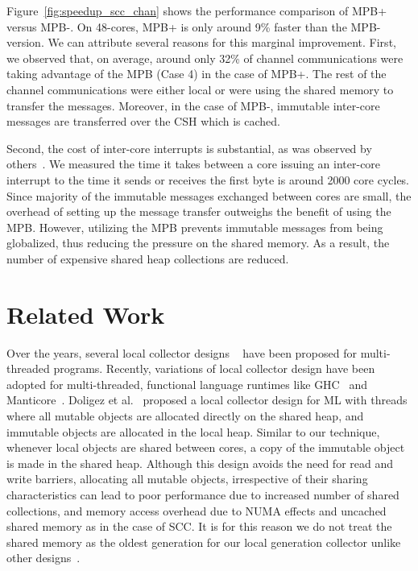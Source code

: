 Figure~\ref{fig:speedup_scc_chan} shows the performance comparison of MPB+
versus MPB-. On 48-cores, MPB+ is only around 9\% faster than the MPB- version.
We can attribute several reasons for this marginal improvement. First, we
observed that, on average, around only 32\% of channel communications were
taking advantage of the MPB (Case 4) in the case of MPB+. The rest of the
channel communications were either local or were using the shared memory to
transfer the messages. Moreover, in the case of MPB-, immutable inter-core
messages are transferred over the CSH which is cached.

Second, the cost of inter-core interrupts is substantial, as was observed by
others~\cite{Peter11,Darko11}. We measured the time it takes between a core
issuing an inter-core interrupt to the time it sends or receives the first byte
is around 2000 core cycles. Since majority of the immutable messages exchanged
between cores are small, the overhead of setting up the message transfer
outweighs the benefit of using the MPB. However, utilizing the MPB prevents
immutable messages from being globalized, thus reducing the pressure on the
shared memory. As a result, the number of expensive shared heap collections are
reduced.

\section{Related Work}

Over the years, several local collector designs ~\cite{Steele75, Doligez93,
Steensgaard00, Anderson10} have been proposed for multi-threaded programs.
Recently, variations of local collector design have been adopted for
multi-threaded, functional language runtimes like GHC~\cite{Marlow11} and
Manticore~\cite{Auhagen11}. Doligez et al.~\cite{Doligez93} proposed a local
collector design for ML with threads where all mutable objects are allocated
directly on the shared heap, and immutable objects are allocated in the local
heap. Similar to our technique, whenever local objects are shared between
cores, a copy of the immutable object is made in the shared heap. Although this
design avoids the need for read and write barriers, allocating all mutable
objects, irrespective of their sharing characteristics can lead to poor
performance due to increased number of shared collections, and memory access
overhead due to NUMA effects and uncached shared memory as in the case of SCC.
It is for this reason we do not treat the shared memory as the oldest
generation for our local generation collector unlike other
designs~\cite{Doligez93, Marlow11}.

